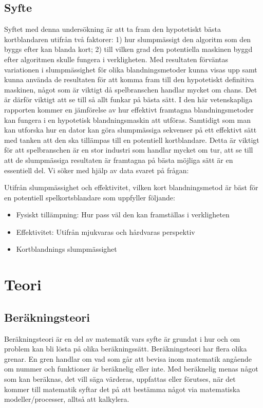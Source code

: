 \documentclass[swedish,a4paper]{article}
\begin{document}
\subsection{Syfte}

Syftet med denna undersökning är att ta fram den hypotetiskt bästa kortblandaren
utifrån två faktorer: 1) hur slumpmässigt den algoritm som den byggs efter kan
blanda kort; 2) till vilken grad den potentiella maskinen byggd efter algoritmen
skulle fungera i verkligheten. Med resultaten förväntas variationen i
slumpmässighet för olika blandningsmetoder kunna visas upp samt kunna använda de
resultaten för att komma fram till den hypotetiskt definitiva maskinen, något
som är viktigt då spelbranschen handlar mycket om chans. Det är därför viktigt
att se till så allt funkar på bästa sätt. I den här vetenskapliga rapporten
kommer en jämförelse av hur effektivt framtagna blandningsmetoder kan fungera i
en hypotetisk blandningsmaskin att utföras. Samtidigt som man kan utforska hur
en dator kan göra slumpmässiga sekvenser på ett effektivt sätt med tanken att
den ska tillämpas till en potentiell kortblandare. Detta är viktigt för att
spelbranschen är en stor industri som handlar mycket om tur, att se till att de
slumpmässiga resultaten är framtagna på bästa möjliga sätt är en essentiell del.
Vi söker med hjälp av data svaret på frågan:

Utifrån slumpmässighet och effektivitet, vilken kort blandningsmetod är bäst för
en potentiell spelkortsblandare som uppfyller följande:
\begin{itemize}
	\item Fysiskt tillämpning: Hur pass väl den kan framställas i verkligheten 
	\item Effektivitet: Utifrån mjukvaras och hårdvaras perspektiv
        \item Kortblandnings slumpmässighet
\end{itemize}


\section{Teori}
\subsection{Beräkningsteori}

Beräkningsteori är en del av matematik vars syfte är grundat i hur och om
problem kan bli lösta på olika beräkningssätt. Beräkningsteori har flera olika
grenar. En gren handlar om vad som går att bevisa inom matematik angående om
nummer och funktioner är beräknelig eller inte. Med beräknelig menas något som
kan beräknas, det vill säga värderas, uppfattas eller förutses, när det kommer
till matematik syftar det på att bestämma något via matematiska
modeller/processer, alltså att kalkylera.
\end{document}

